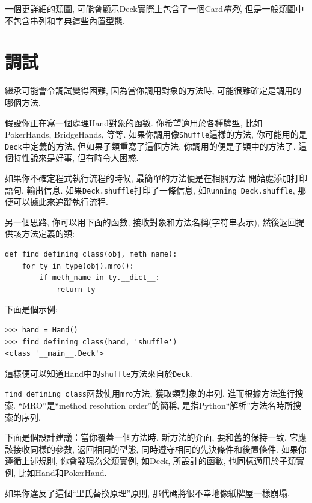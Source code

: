 \documentclass[10pt]{book}
\begin{document}
一個更詳細的類圖, 可能會顯示Deck實際上包含了一個Card{\em 串列}, 
但是一般類圖中不包含串列和字典這些內置型態. 

\section{調試}

繼承可能會令調試變得困難, 因為當你調用對象的方法時, 
可能很難確定是調用的哪個方法. 

假設你正在寫一個處理Hand對象的函數. 
你希望適用於各種牌型, 比如PokerHands, BridgeHands, 等等. 
如果你調用像{\tt Shuffle}這樣的方法, 
你可能用的是{\tt Deck}中定義的方法, 
但如果子類重寫了這個方法, 
你調用的便是子類中的方法了. 
這個特性說來是好事, 但有時令人困惑. 

如果你不確定程式執行流程的時候, 最簡單的方法便是在相關方法
開始處添加打印語句, 輸出信息. 
如果{\tt Deck.shuffle}打印了一條信息, 如{\tt Running Deck.shuffle}, 
那便可以據此來追蹤執行流程. 

另一個思路, 你可以用下面的函數, 接收對象和方法名稱(字符串表示), 
然後返回提供該方法定義的類:

\begin{verbatim}
def find_defining_class(obj, meth_name):
    for ty in type(obj).mro():
        if meth_name in ty.__dict__:
            return ty
\end{verbatim}
%
下面是個示例:

\begin{verbatim}
>>> hand = Hand()
>>> find_defining_class(hand, 'shuffle')
<class '__main__.Deck'>
\end{verbatim}
%
這樣便可以知道Hand中的{\tt shuffle}方法來自於{\tt Deck}.

\verb"find_defining_class"函數使用{\tt mro}方法, 獲取類對象的串列, 
進而根據方法進行搜索. 
``MRO''是``method resolution order''的簡稱, 
是指Python``解析''方法名時所搜索的序列.

下面是個設計建議：當你覆蓋一個方法時, 
新方法的介面, 要和舊的保持一致. 
它應該接收同樣的參數, 返回相同的型態, 
同時遵守相同的先決條件和後置條件. 
如果你遵循上述規則, 你會發現為父類實例, 如Deck, 所設計的函數, 
也同樣適用於子類實例, 比如Hand和PokerHand. 


如果你違反了這個``里氏替換原理''原則, 
那代碼將很不幸地像紙牌屋一樣崩塌. 
\end{document}
